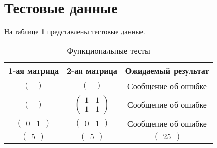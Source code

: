 \captionsetup{singlelinecheck = false, justification=raggedleft}



\section{Тестовые данные}

На таблице \ref{tbl:functional_test} представлены тестовые данные.

\begin{table}[ht!]
	\begin{center}
			\captionsetup{justification=raggedright,singlelinecheck=off}
			\caption{\label{tbl:functional_test} Функциональные тесты}
			\begin{tabular}{|c|c|c|}
				\hline
				1-ая матрица & 2-ая матрица & Ожидаемый результат 
				\\ \hline
				$\begin{pmatrix}
					\\
				\end{pmatrix}$ &
				$\begin{pmatrix}
					\\
				\end{pmatrix}$ &
				Сообщение об ошибке
				
				\\ \hline
				$\begin{pmatrix}
					\\
				\end{pmatrix}$ &
				$\begin{pmatrix}
					1 & 1\\
					1 & 1
				\end{pmatrix}$ &
				Сообщение об ошибке
				
				\\ \hline
				$\begin{pmatrix}
					0 & 1
				\end{pmatrix}$ &
				$\begin{pmatrix}
					0 & 1
				\end{pmatrix}$ &
				Сообщение об ошибке 
				
				\\ \hline
				$\begin{pmatrix}
					5
				\end{pmatrix}$ &
				$\begin{pmatrix}
					5
				\end{pmatrix}$ &
				$\begin{pmatrix}
					25
				\end{pmatrix}$
				

\end{tabular}
\end{center}
\end{table}

